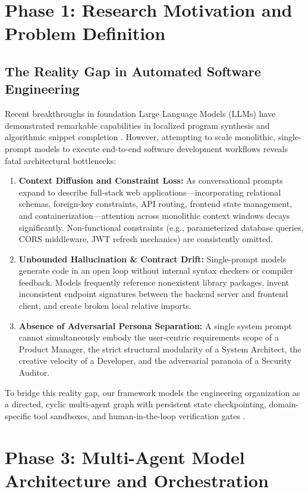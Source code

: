 \documentclass[10pt,journal,compsoc]{IEEEtran}
\begin{document}
\section{Phase 1: Research Motivation and Problem Definition}

\subsection{The Reality Gap in Automated Software Engineering}
Recent breakthroughs in foundation Large Language Models (LLMs) have demonstrated remarkable capabilities in localized program synthesis and algorithmic snippet completion \cite{touvron2023llama}. However, attempting to scale monolithic, single-prompt models to execute end-to-end software development workflows reveals fatal architectural bottlenecks:
\begin{enumerate}
    \item \textbf{Context Diffusion and Constraint Loss:} As conversational prompts expand to describe full-stack web applications—incorporating relational schemas, foreign-key constraints, API routing, frontend state management, and containerization—attention across monolithic context windows decays significantly. Non-functional constraints (e.g., parameterized database queries, CORS middleware, JWT refresh mechanics) are consistently omitted.
    \item \textbf{Unbounded Hallucination \& Contract Drift:} Single-prompt models generate code in an open loop without internal syntax checkers or compiler feedback. Models frequently reference nonexistent library packages, invent inconsistent endpoint signatures between the backend server and frontend client, and create broken local relative imports.
    \item \textbf{Absence of Adversarial Persona Separation:} A single system prompt cannot simultaneously embody the user-centric requirements scope of a Product Manager, the strict structural modularity of a System Architect, the creative velocity of a Developer, and the adversarial paranoia of a Security Auditor.
\end{enumerate}

To bridge this reality gap, our framework models the engineering organization as a directed, cyclic multi-agent graph with persistent state checkpointing, domain-specific tool sandboxes, and human-in-the-loop verification gates \cite{hong2023metagpt, qian2023chatdev}.

\section{Phase 3: Multi-Agent Model Architecture and Orchestration}
\end{document}
